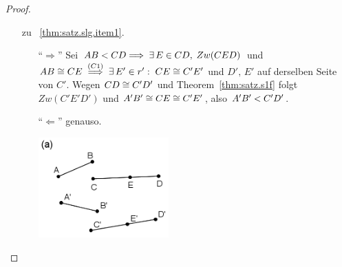 \begin{proof}
    \begin{enumerate}
        \item[zu ~\ref{thm:satz.slg.item1}.]\ %
            \begin{itemize}
                \item["`$\Longrightarrow$"'] Sei ${AB} < {CD} \Longrightarrow\; \exists\, E
                    \in {CD},\; Zw(CED)$ und ${AB} \cong {CE}\;
                    \stackrel{(C1)}{\Longrightarrow}\; \exists\, E' \in r':\; {CE} \cong
                    {C'E'}$ und $D',\, E'$ auf derselben Seite von $C'$.  Wegen ${CD} \cong
                    {C'D'}$ und Theorem~\ref{thm:satz.s1f} folgt $Zw(C'E'D')$ und ${A'B'}
                    \cong {CE} \cong {C'E'}$, also ${A'B'} < {C'D'}$.

                \item["`$\Longleftarrow$"'] genauso.

                \centerline{\includegraphics[width=5cm]{BILDER/1-2-06a-Ord.png}}
            \end{itemize}





\end{enumerate}
\end{proof}
